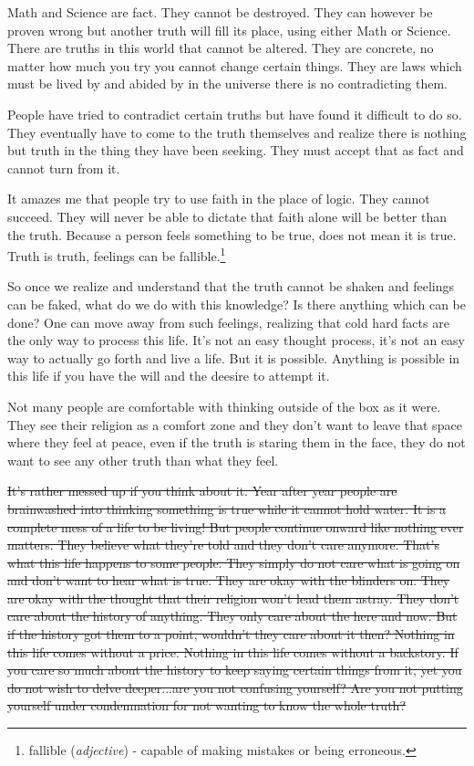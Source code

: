 Math and Science are fact. They cannot be destroyed. They can however be proven
wrong but another truth will fill its place, using either Math or Science. There
are truths in this world that cannot be altered. They are concrete, no matter
how much you try you cannot change certain things. They are laws which must be
lived by and abided by in the universe there is no contradicting them.

People have tried to contradict certain truths but have found it difficult to do
so. They eventually have to come to the truth themselves and realize there is
nothing but truth in the thing they have been seeking. They must accept that as
fact and cannot turn from it.

It amazes me that people try to use faith in the place of logic. They cannot
succeed. They will never be able to dictate that faith alone will be better than
the truth. Because a person feels something to be true, does not mean it is
true. Truth is truth, feelings can be fallible.\footnote{
fallible (\textit{adjective}) - capable of making mistakes or being erroneous.
}

So once we realize and understand that the truth cannot be shaken and feelings
can be faked, what do we do with this knowledge? Is there anything which can be
done? One can move away from such feelings, realizing that cold hard facts are
the only way to process this life. It's not an easy thought process, it's not an
easy way to actually go forth and live a life. But it is possible. Anything is
possible in this life if you have the will and the deesire to attempt it.

Not many people are comfortable with thinking outside of the box as it were.
They see their religion as a comfort zone and they don't want to leave that
space where they feel at peace, even if the truth is staring them in the face,
they do not want to see any other truth than what they feel.

\st{It's rather messed up if you think about it. Year after year people are 
brainwashed into thinking something is true while it cannot hold water. It is a
complete mess of a life to be living! But people continue onward like nothing
ever matters. They believe what they're told and they don't care anymore. That's
what this life happens to some people. They simply do not care what is going on
and don't want to hear what is true. They are okay with the blinders on. They 
are okay with the thought that their religion won't lead them astray. They don't
care about the history of anything. They only care about the here and now. But
if the history got them to a point, wouldn't they care about it then? Nothing in
this life comes without a price. Nothing in this life comes without a backstory.
If you care so much about the history to keep saying certain things from it, yet
you do not wish to delve deeper...are you not confusing yourself? Are you not
putting yourself under condemnation for not wanting to know the whole truth?}

